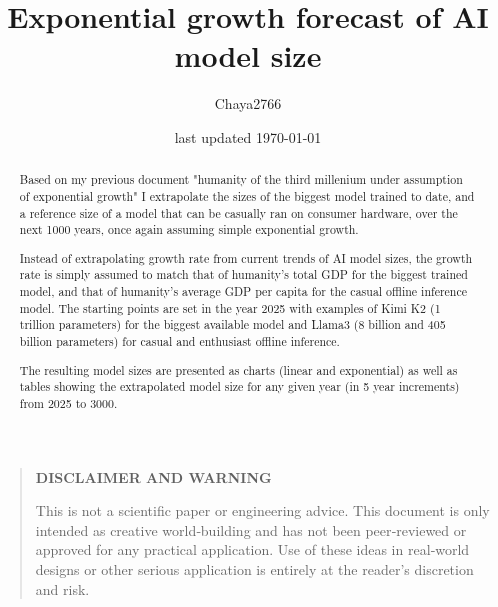 \documentclass[a4paper]{article}
\title{Exponential growth forecast of AI model size}
\author{Chaya2766}
\date{last updated \today}
\begin{document}
	\sffamily
	\hyphenchar{}
	\sloppy
	
	\maketitle
	
	\textbf{
		\sloppy
		\hyphenchar{}
		}
	
	\vfill
	
	\begin{abstract}
		\hyphenchar{}
		\sloppy
		Based on my previous document "humanity of the third millenium under assumption of exponential growth" I extrapolate the sizes of the biggest model trained to date, and a reference size of a model that can be casually ran on consumer hardware, over the next 1000 years, once again assuming simple exponential growth.
		
		\medskip
		
		Instead of extrapolating growth rate from current trends of AI model sizes, the growth rate is simply assumed to match that of humanity's total GDP for the biggest trained model, and that of humanity's average GDP per capita for the casual offline inference model.
		The starting points are set in the year 2025 with examples of Kimi K2 (1 trillion parameters) for the biggest available model and Llama3 (8 billion and 405 billion parameters) for casual and enthusiast offline inference.
		
		\medskip
		
		The resulting model sizes are presented as charts (linear and exponential) as well as tables showing the extrapolated model size for any given year (in 5 year increments) from 2025 to 3000.
	\end{abstract}
	
	\vfill
	
	\begin{quote}
		\begin{center}
			\textbf{DISCLAIMER AND WARNING}
		\end{center}
		
		This is not a scientific paper or engineering advice.
		This document is only intended as creative world‑building and has not been peer‑reviewed or approved for any practical application.
		Use of these ideas in real‑world designs or other serious application is entirely at the reader’s discretion and risk.
	\end{quote}
	
	\vfill
	
\end{document}
